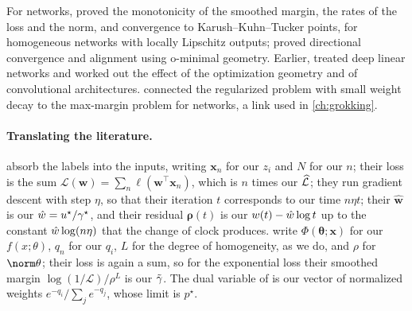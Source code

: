 \begin{refsection}
For networks, \textcite{LyuLi2020} proved the monotonicity of the smoothed margin, the rates of the loss and the norm, and convergence to Karush--Kuhn--Tucker points, for homogeneous networks with locally Lipschitz outputs; \textcite{JiTelgarsky2020} proved directional convergence and alignment using o-minimal geometry. Earlier, \textcite{JiTelgarsky2019a} treated deep linear networks and \textcite{GunasekarEtAl2018a,GunasekarEtAl2018b} worked out the effect of the optimization geometry and of convolutional architectures. \Textcite{WeiEtAl2019} connected the regularized problem with small weight decay to the max-margin problem for networks, a link used in \cref{ch:grokking}.

\paragraph{Translating the literature.} \Textcite{SoudryEtAl2018} absorb the labels into the inputs, writing $\mathbf x_n$ for our $z_i$ and $N$ for our $n$; their loss is the sum $\mathcal L(\mathbf w)=\sum_n\ell(\mathbf w^\top\mathbf x_n)$, which is $n$ times our $\widehat{\mathcal{L}}$; they run gradient descent with step $\eta$, so that their iteration $t$ corresponds to our time $n\eta t$; their $\hat{\mathbf w}$ is our $\hat w=u^\star/\gamma^\star$, and their residual $\boldsymbol\rho(t)$ is our $w(t)-\hat w\log t$ up to the constant $\hat w\log(n\eta)$ that the change of clock produces. \Textcite{LyuLi2020} write $\Phi(\boldsymbol\theta;\mathbf x)$ for our $f(x;\theta)$, $q_n$ for our $q_i$, $L$ for the degree of homogeneity, as we do, and $\rho$ for $\norm\theta$; their loss is again a sum, so for the exponential loss their smoothed margin $\log(1/\mathcal L)/\rho^L$ is our $\tilde\gamma$. The dual variable of \textcite{JiTelgarsky2021} is our vector of normalized weights $e^{-q_i}/\sum_je^{-q_j}$, whose limit is $p^\star$.

\printchapterbib
\end{refsection}
